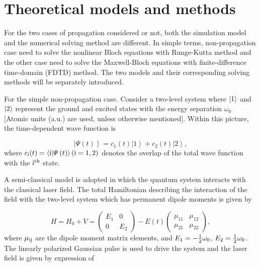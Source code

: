 \documentclass[10pt,letterpaper]{article}
\begin{document}
\section{Theoretical models and methods}
For the two cases of propagation considered or not, both the simulation model and the numerical solving method are different. In simple terms, non-propagation case need to solve the nonlinear Bloch equations with Runge-Kutta method and the other case need to solve the Maxwell-Bloch equations with finite-difference time-domain (FDTD) method. The two models and their corresponding solving methods will be separately introduced.

For the simple non-propagation case. Consider a two-level system where $\left| {\rm{1}} \right\rangle$ and $\left| {\rm{2}} \right\rangle$ represent the ground and excited states with the energy separation $ \omega_0 $ [Atomic units (a.u.) are used, unless otherwise mentioned]. Within this picture, the time-dependent wave function is

\begin{equation}
\left| {\varPsi \left( t \right)} \right\rangle  = {c_1}(t)\left| 1 \right\rangle  + {c_2}(t)\left| 2 \right\rangle,
\label{eq1}
\end{equation}
where $ c_{\rm{i}}(t) = \left\langle {\rm{i}} | \varPsi \left( t \right) \right\rangle(\rm{i}=1,2) $ denotes the overlap of the total wave function with the $\rm{i}^{th}$ state.

A semi-classical model is adopted in which the quantum system interacts with the classical laser field. The total Hamiltonian describing the interaction of the field with the two-level system which has permanent dipole moments is given by \cite{YangWeifeng-Two-Level-PLA-2007}

\begin{equation}
H = {H_0} + V = \left( {\begin{array}{*{20}{c}}
	{{E_1}}&0\\
	0&{{E_2}}
	\end{array}} \right) - E(t)\left( {\begin{array}{*{20}{c}}
	{{\mu _{11}}}&{{\mu _{12}}}\\
	{{\mu _{21}}}&{{\mu _{22}}}
	\end{array}} \right),
\label{eq2}
\end{equation}
where $ \mu_{\rm{ij}} $ are the dipole moment matrix elements, and ${E_1} =  - {1 \over 2}{\omega _0}$, ${E_2} =   {1 \over 2}{\omega _0}$. The linearly polarized Gaussian pulse is used to drive the system and the laser field is given by expression of
\end{document}
